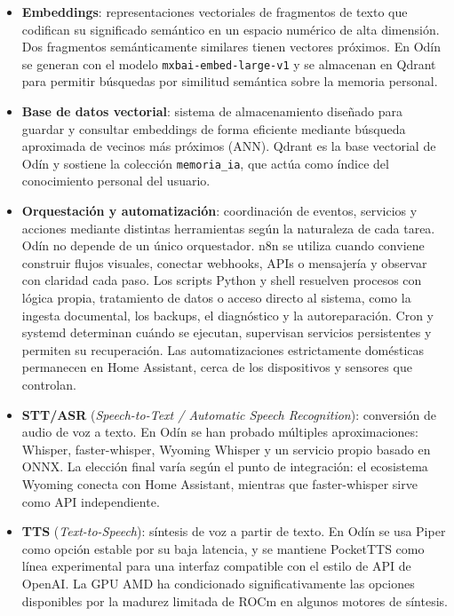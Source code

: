 \begin{itemize}
  \item \textbf{Embeddings}: representaciones vectoriales de fragmentos de texto que codifican su significado semántico en un espacio numérico de alta dimensión. Dos fragmentos semánticamente similares tienen vectores próximos. En Odín se generan con el modelo \texttt{mxbai-embed-large-v1} y se almacenan en Qdrant para permitir búsquedas por similitud semántica sobre la memoria personal.

  \item \textbf{Base de datos vectorial}: sistema de almacenamiento diseñado para guardar y consultar embeddings de forma eficiente mediante búsqueda aproximada de vecinos más próximos (ANN). Qdrant es la base vectorial de Odín y sostiene la colección \texttt{memoria\_ia}, que actúa como índice del conocimiento personal del usuario.

  \item \textbf{Orquestación y automatización}: coordinación de eventos, servicios y acciones mediante distintas herramientas según la naturaleza de cada tarea. Odín no depende de un único orquestador. n8n se utiliza cuando conviene construir flujos visuales, conectar webhooks, APIs o mensajería y observar con claridad cada paso. Los scripts Python y shell resuelven procesos con lógica propia, tratamiento de datos o acceso directo al sistema, como la ingesta documental, los backups, el diagnóstico y la autoreparación. Cron y systemd determinan cuándo se ejecutan, supervisan servicios persistentes y permiten su recuperación. Las automatizaciones estrictamente domésticas permanecen en Home Assistant, cerca de los dispositivos y sensores que controlan.

  \item \textbf{STT/ASR} (\textit{Speech-to-Text / Automatic Speech Recognition}): conversión de audio de voz a texto. En Odín se han probado múltiples aproximaciones: Whisper, faster-whisper, Wyoming Whisper y un servicio propio basado en ONNX. La elección final varía según el punto de integración: el ecosistema Wyoming conecta con Home Assistant, mientras que faster-whisper sirve como API independiente.

  \item \textbf{TTS} (\textit{Text-to-Speech}): síntesis de voz a partir de texto. En Odín se usa Piper como opción estable por su baja latencia, y se mantiene PocketTTS como línea experimental para una interfaz compatible con el estilo de API de OpenAI. La GPU AMD ha condicionado significativamente las opciones disponibles por la madurez limitada de ROCm en algunos motores de síntesis.


\end{itemize}
